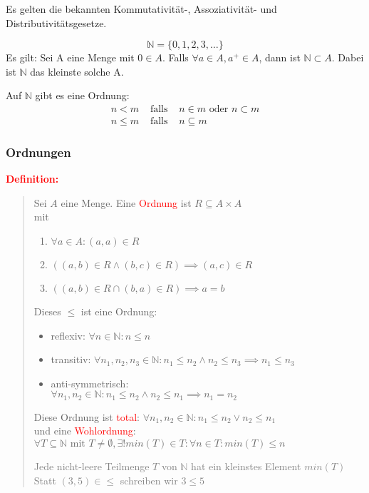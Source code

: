 \documentclass{article}
\newcommand{\red}[1]{\textcolor{red}{#1}}
\newcommand{\gray}[1]{\textcolor{gray}{#1}}
\newcommand{\de}[1]{\red{\textbf{Definition: }}\begin{quote}#1\end{quote}}
\newcommand{\N}{\mathbb{N}}
\begin{document}
Es gelten die bekannten Kommutativität-, Assoziativität- und \\Distributivitätsgesetze.

\[
    \N = \{0, 1, 2, 3, \dots\}
\]
Es gilt: Sei A eine Menge mit $0 \in A$. Falls $\forall a \in A, a^+ \in A$, dann ist $\N \subset A$. Dabei ist $\N$ das kleinste solche A.

Auf $\N$ gibt es eine Ordnung:
\[
    \begin{array}{lcl}
        n < m &\text{ falls }& n \in m \text{ oder } n \subset m\\
        n \leq m &\text{ falls }& n \subseteq m
    \end{array}
\]

\subsubsection{Ordnungen}

\de{
    Sei $A$ eine Menge. Eine \red{Ordnung} ist $R \subseteq A \times A$\\
    mit\begin{enumerate}
        \item $\forall a \in A: (a, a) \in R$
        \item $((a, b) \in R \land (b, c) \in R) \implies (a, c) \in R$
        \item $((a,b) \in R \cap (b, a) \in R) \implies a = b$
    \end{enumerate}
    Dieses $\leq$ ist eine Ordnung:
    \begin{itemize}
        \item reflexiv: $\forall n \in \N: n \leq n$
        \item transitiv: $\forall n_1, n_2, n_3 \in \N: n_1 \leq n_2 \land n_2 \leq n_3 \implies n_1 \leq n_3$
        \item anti-symmetrisch:\\$\forall n_1, n_2 \in \N: n_1 \leq n_2 \land n_2 \leq n_1 \implies n_1 = n_2$
    \end{itemize}
    Diese Ordnung ist \red{total}: $\forall n_1, n_2 \in \N: n_1 \leq n_2 \lor n_2 \leq n_1$\\
    und eine \red{Wohlordnung}:\\ $\forall T \subseteq \N \text{ mit } T \neq \emptyset, \exists! min(T) \in T: \forall n \in T: min(T) \leq n$

    \gray{
        Jede nicht-leere Teilmenge $T$ von $\N$ hat ein kleinstes Element $min(T)$\\
        Statt $(3,5) \in \leq$ schreiben wir $3 \leq 5$
    }
}
\end{document}
